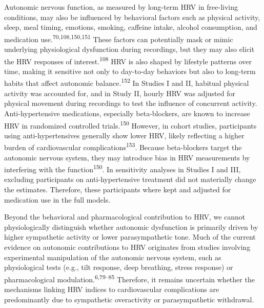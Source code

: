 \documentclass[
  letterpaper,
  headsepline=true,
  open=any]{scrbook}
\begin{document}
Autonomic nervous function, as measured by long-term HRV in free-living
conditions, may also be influenced by behavioral factors such as
physical activity, sleep, meal timing, emotions, smoking, caffeine
intake, alcohol consumption, and medication
use.\textsuperscript{70,108,150,151} These factors can potentially mask
or mimic underlying physiological dysfunction during recordings, but
they may also elicit the HRV responses of interest.\textsuperscript{108}
HRV is also shaped by lifestyle patterns over time, making it sensitive
not only to day-to-day behaviors but also to long-term habits that
affect autonomic balance.\textsuperscript{152} In Studies I and II,
habitual physical activity was accounted for, and in Study II, hourly
HRV was adjusted for physical movement during recordings to test the
influence of concurrent activity. Anti-hypertensive medications,
especially beta-blockers, are known to increase HRV in randomized
controlled trials.\textsuperscript{150} However, in cohort studies,
participants using anti-hypertensives generally show lower HRV, likely
reflecting a higher burden of cardiovascular
complications\textsuperscript{153}. Because beta-blockers target the
autonomic nervous system, they may introduce bias in HRV measurements by
interfering with the function\textsuperscript{150}. In sensitivity
analyses in Studies I and III, excluding participants on
anti-hypertensive treatment did not materially change the estimates.
Therefore, these participants where kept and adjusted for medication use
in the full models.

Beyond the behavioral and pharmacological contribution to HRV, we cannot
physiologically distinguish whether autonomic dysfunction is primarily
driven by higher sympathetic activity or lower parasympathetic tone.
Much of the current evidence on autonomic contributions to HRV
originates from studies involving experimental manipulation of the
autonomic nervous system, such as physiological tests (e.g., tilt
response, deep breathing, stress response) or pharmacological
modulation.\textsuperscript{6,79--85} Therefore, it remains uncertain
whether the mechanisms linking HRV indices to cardiovascular
complications are predominantly due to sympathetic overactivity or
parasympathetic withdrawal.
\end{document}
